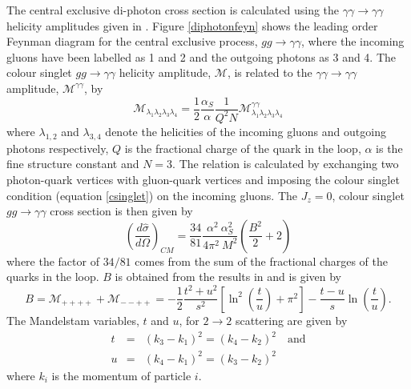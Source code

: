 The central exclusive di-photon cross section is calculated using the $\gamma \gamma \rightarrow \gamma \gamma$ helicity amplitudes given in \cite{Bern:2001dg}. Figure \ref{diphotonfeyn} shows the leading order Feynman diagram for the central exclusive process, $gg\rightarrow \gamma \gamma$, where the incoming gluons have been labelled as 1 and 2 and the outgoing photons as 3 and 4.
The colour singlet $gg \rightarrow \gamma \gamma$ helicity amplitude, $\mathcal{M}$, is related to the $\gamma \gamma \rightarrow \gamma \gamma$ amplitude, $\mathcal{M}^{\gamma \gamma}$, by 
\begin{equation}
\mathcal{M}_{\lambda_1 \lambda_2 \lambda_3 \lambda_4} = 
\frac{1}{2}\frac{\alpha_S}{\alpha}\frac{1}{Q^2N}
\mathcal{M}^{\gamma \gamma}_{\lambda_1 \lambda_2 \lambda_3 \lambda_4}
\end{equation}
where $\lambda_{1,2}$ and $\lambda_{3,4}$ denote the helicities of the incoming gluons and outgoing photons respectively, $Q$ is the fractional charge of the quark in the loop, $\alpha$ is the fine structure constant and $N=3$. The relation is calculated by exchanging two photon-quark vertices with gluon-quark vertices and imposing the colour singlet condition (equation \ref{csinglet}) on the incoming gluons.
The $J_z=0$, colour singlet $gg\rightarrow \gamma \gamma$ cross section is then given by
\begin{equation}
\left(\frac{d\hat{\sigma}}{d\Omega}\right)_{CM} =
\frac{34}{81}\frac{\alpha^2~\alpha_S^2}{4\pi^2~M^2}\left(\frac{B^2}{2} + 2\right)
\end{equation}
where the factor of $34/81$ comes from the sum of the fractional charges of the quarks in the loop. $B$ is obtained from the results in \cite{Bern:2001dg} and is given by
\begin{equation}
B = 
\mathcal{M}_{++++} + \mathcal{M}_{--++} = 
-\frac{1}{2}\frac{t^2 + u^2}{s^2}
\left[\ln^2\left(\frac{t}{u}\right) + \pi^2 \right]
-\frac{t-u}{s}\ln\left(\frac{t}{u}\right).
\end{equation}
The Mandelstam variables, $t$ and $u$, for $2\rightarrow 2$ scattering are given by
\begin{eqnarray}
 t & = & \left(k_3 -k_1  \right)^2 = \left(k_4 -k_2  \right)^2  \quad \text{and} \\
 u & = &  \left(k_4 -k_1 \right)^2 = \left(k_3 -k_2  \right)^2   
\end{eqnarray}
 where $k_i$ is the momentum of particle $i$.

